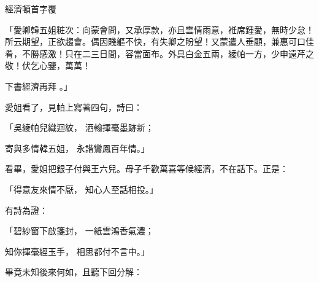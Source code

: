 經濟頓首字覆

「愛卿韓五姐粧次：向蒙會問，又承厚款，亦且雲情雨意，袵席鍾愛，無時少怠！所云期望，正欲趨會。偶因賤軀不快，有失卿之盼望！又蒙遣人垂顧，兼惠可口佳肴，不勝感激！只在二三日間，容當面布。外具白金五兩，綾帕一方，少申遠芹之敬！伏乞心鑒，萬萬！

下書經濟再拜   。」

愛姐看了，見帕上寫著四句，詩曰：

「吳綾帕兒織迴紋，  洒翰揮毫墨跡新；

寄與多情韓五姐，  永諧鸞鳳百年情。」

看畢，愛姐把銀子付與王六兒。母子千歡萬喜等候經濟，不在話下。正是：

「得意友來情不厭，  知心人至話相投。」

有詩為證：

「碧紗窗下啟箋封，  一紙雲鴻香氣濃；

知你揮毫經玉手，  相思都付不言中。」

畢竟未知後來何如，且聽下回分解：

